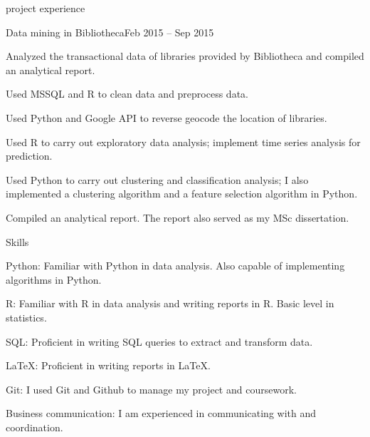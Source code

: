 \documentclass{resume} %
\begin{document}
\begin{rSection}{project experience}

\begin{rSubsection}{Data mining in Bibliotheca}{Feb 2015 -- Sep 2015}{}{}
\item Analyzed the transactional data of libraries provided by Bibliotheca and compiled an analytical report.
\item Used MSSQL and R to clean data and preprocess data.
\item Used Python and Google API to reverse geocode the location of libraries.
\item Used R to carry out exploratory data analysis; implement time series analysis for prediction.
\item Used Python to carry out clustering and classification analysis; I also implemented a clustering algorithm and a feature selection algorithm in Python.
\item Compiled an analytical report. The report also served as my MSc dissertation.

\end{rSubsection}

\end{rSection}




\begin{rSection}{Skills}

\begin{rSubsection}{}{}{}{}
\item {Python:} Familiar with Python in data analysis. Also capable of implementing algorithms in Python.
\item {R:} Familiar with R in data analysis and writing reports in R. Basic level in statistics.
\item {SQL:} Proficient in writing SQL queries to extract and transform data.
\item {\LaTeX{}:} Proficient in writing reports in \LaTeX{}.
\item{Git}: I used Git and Github to manage my project and coursework.
\item {Business communication:} I am experienced in communicating with and coordination.
\end{rSubsection}

\end{rSection}
\end{document}
